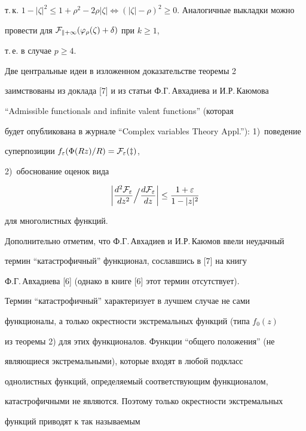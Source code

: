 т.\,к. $1-|\zeta|^2\le1+\rho^2-2\rho|\zeta| 


\Longleftrightarrow(|\zeta|-\rho)^2\ge 0$. Аналогичные выкладки можно 


провести для $\cal F_{k+1}(\varphi_\rho(\zeta)+\delta)$ при $k\ge1$, 


т.\,е. в случае $p\ge 4$. 


 


Две центральные идеи в изложенном доказательстве теоремы 2 


заимствованы из доклада [7] и из статьи Ф.Г.\,Авхадиева и И.Р.\,Каюмова 


``Admissible functionals and infinite valent functions'' (которая 


будет опубликована в журнале ``Complex variables Theory Appl.''): 1)~поведение 


суперпозиции $f_\varepsilon(\Phi(R z)/R)=\cal F_\varepsilon(z)$, 


2)~обоснование оценок вида 


$$ 


\bigg|\frac{d^2\cal F_\varepsilon}{d z^2}\Big/ 


\frac{d\cal F_\varepsilon}{d z}\bigg|\le 


\frac{1+\varepsilon}{1-|z|^2} 


$$ 


для многолистных функций. 


 


Дополнительно отметим, что Ф.Г.\,Авхадиев и И.Р.\,Каюмов ввели неудачный 


термин ``катастрофичный'' функционал, сославшись в [7] на книгу 


Ф.Г.\,Авхадиева [6] (однако в книге [6] этот термин отсутствует). 


Термин ``катастрофичный'' характеризует в лучшем случае не сами 


функционалы, а только окрестности экстремальных функций (типа $f_0(z)$ 


из теоремы 2) для этих функционалов. Функции ``общего положения'' (не 


являющиеся экстремальными), которые входят в любой подкласс 


однолистных функций, определяемый соответствующим функционалом, 


катастрофичными не являются. Поэтому только окрестности экстремальных 


функций приводят к так называемым 


